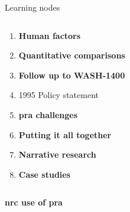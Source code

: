 \documentclass[aspectratio=1610,pdftex,dvipsnames,compress,xcolor={dvipsnames}]{beamer}
\newcommand{\acs}{\acrshort} %
\begin{document}
\begin{frame}{Learning nodes}
\begin{columns}[t]
        \begin{column}{0.50\textwidth}
            \begin{enumerate}[series=outerlist,topsep=0pt,itemsep=1pt,leftmargin=*,label=(\arabic*)]
                \item[]\hfill\textbf{Human factors}
                    \vspace{0.15in}
                \item[]\hfill\textbf{Quantitative comparisons}
                    \vspace{0.15in}
                \item[]\hfill\textbf{Follow up to WASH-1400}
                \item[]\hfill 1995 Policy statement
                    \vspace{0.15in}
                \item[]\hfill\textbf{\acs{pra} challenges}
                    \vspace{0.15in}
                \item[]\hfill\textbf{Putting it all together}
                    \vspace{0.15in}
                \item[]\hfill\textbf{Narrative research}
                    \vspace{0.15in}
                \item[]\hfill\textbf{Case studies}
            \end{enumerate}
        \end{column}

    \end{columns}
\end{frame}


\begin{frame}[plain]{}
    \centering\LARGE\textbf{\acs{nrc} use of \acs{pra}}
\end{frame}
\end{document}
